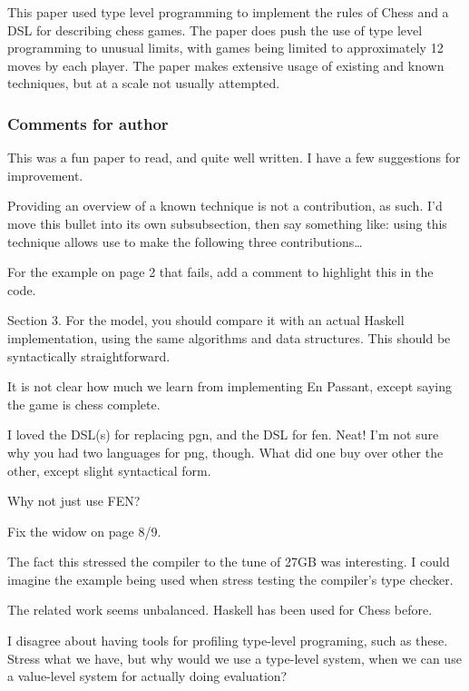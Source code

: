 This paper used type level programming to implement the rules of Chess and a DSL for describing chess games. The paper does push the use of type level programming to unusual limits, with games being limited to approximately 12 moves by each player. The paper makes extensive usage of existing and known techniques, but at a scale not usually attempted.

\subsubsection{Comments for author}

This was a fun paper to read, and quite well written. I have a few suggestions for improvement.

Providing an overview of a known technique is not a contribution, as such. I'd move this bullet into its own subsubsection, then say something like: using this technique allows use to make the following three contributions…

For the example on page 2 that fails, add a comment to highlight this in the code.

Section 3. For the model, you should compare it with an actual Haskell implementation, using the same algorithms and data structures. This should be syntactically straightforward.

It is not clear how much we learn from implementing En Passant, except saying the game is chess complete.

I loved the DSL(s) for replacing pgn, and the DSL for fen. Neat! I'm not sure why you had two languages for png, though. What did one buy over other the other, except slight syntactical form.

Why not just use FEN?

Fix the widow on page 8/9.

The fact this stressed the compiler to the tune of 27GB was interesting. I could imagine the example being used when stress testing the compiler's type checker.

The related work seems unbalanced. Haskell has been used for Chess before.

I disagree about having tools for profiling type-level programing, such as these. Stress what we have, but why would we use a type-level system, when we can use a value-level system for actually doing evaluation?

